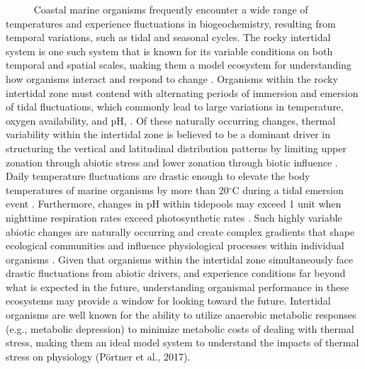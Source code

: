 \documentclass[
  12pt,
]{article}
\begin{document}
~~~~~ Coastal marine organisms frequently encounter a wide range of
temperatures and experience fluctuations in biogeochemistry, resulting
from temporal variations, such as tidal and seasonal cycles. The rocky
intertidal system is one such system that is known for its variable
conditions on both temporal and spatial scales, making them a model
ecosystem for understanding how organisms interact and respond to change
\citep{connell1961influence, paine1969pisaster, kwiatkowski2016nighttime, jellison2022low}.
Organisms within the rocky intertidal zone must contend with alternating
periods of immersion and emersion of tidal fluctuations, which commonly
lead to large variations in temperature, oxygen availability, and pH,
\citep{denny2001physical, helmuth2002climate}. Of these naturally
occurring changes, thermal variability within the intertidal zone is
believed to be a dominant driver in structuring the vertical and
latitudinal distribution patterns by limiting upper zonation through
abiotic stress and lower zonation through biotic influence
\citep{helmuth2006mosaic, somero2002thermal, somero2010physiology, connell1961influence}.
Daily temperature fluctuations are drastic enough to elevate the body
temperatures of marine organisms by more than 20\(^\circ\)C during a
tidal emersion event \citep{Helmuth1999thermal}. Furthermore, changes in
pH within tidepools may exceed 1 unit when nighttime respiration rates
exceed photosynthetic rates
\citep{jellison2016ocean, kwiatkowski2016nighttime}. Such highly
variable abiotic changes are naturally occurring and create complex
gradients that shape ecological communities and influence physiological
processes within individual organisms \citep{helmuth2006mosaic}. Given
that organisms within the intertidal zone simultaneously face drastic
fluctuations from abiotic drivers, and experience conditions far beyond
what is expected in the future, understanding organismal performance in
these ecosystems may provide a window for looking toward the future.
Intertidal organisms are well known for the ability to utilize anaerobic
metabolic responses (e.g., metabolic depression) to minimize metabolic
costs of dealing with thermal stress, making them an ideal model system
to understand the impacts of thermal stress on physiology (Pörtner et
al., 2017).
\end{document}
